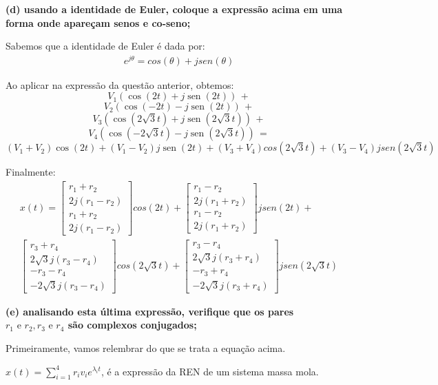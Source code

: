 \documentclass[11pt]{article}
\DeclareMathOperator{\sen}{sen}
\begin{document}
\textbf{(d) usando a identidade de Euler, coloque a expressão acima em uma forma onde apareçam senos e co-seno;}

Sabemos que a identidade de Euler é dada por:
\begin{align*}
  e^{j\theta} = cos(\theta) + jsen(\theta)
\end{align*}

Ao aplicar na expressão da questão anterior, obtemos:
\[V_1(\cos(2t)+j\sen(2t)) \, +\]
\[V_2(\cos(-2t)-j\sen(2t)) \, +\]
\[V_3(\cos(2\sqrt{3}t)+j\sen(2\sqrt{3}t)) \, +\]
\[V_4(\cos(-2\sqrt{3}t)-j\sen(2\sqrt{3}t)) \, =\]
\[(V_1+V_2)\cos(2t) + (V_1-V_2)j\sen(2t) + (V_3+V_4)cos(2\sqrt{3}t) + (V_3-V_4)jsen(2\sqrt{3}t)\]

Finalmente:
\begin{align*}
  x(t) =
  \begin{bmatrix}
    r_1+r_2\\
    2j(r_1-r_2)\\
    r_1+r_2\\
    2j(r_1-r_2)
  \end{bmatrix}
  cos(2t) +
    \begin{bmatrix}
      r_1-r_2\\
      2j(r_1+r_2)\\
      r_1-r_2\\
      2j(r_1+r_2)
    \end{bmatrix}
    jsen(2t) + \\
  \begin{bmatrix}
    r_3+r_4\\
    2\sqrt{3}j(r_3-r_4)\\
    -r_3-r_4\\
    -2\sqrt{3}j(r_3-r_4)
  \end{bmatrix}
  cos(2\sqrt{3}t) +
  \begin{bmatrix}
    r_3-r_4\\
    2\sqrt{3}j(r_3+r_4)\\
    -r_3+r_4\\
    -2\sqrt{3}j(r_3+r_4)
  \end{bmatrix}
  jsen(2\sqrt{3}t)
\end{align*}

\textbf{(e) analisando esta última expressão, verifique que os pares $r_1 \text{ e } r_2, r_3 \text{ e } r_4$ são complexos conjugados;}

Primeiramente, vamos relembrar do que se trata a equação acima.

$x(t) = \sum_{i=1}^4 r_i v_i e^{\lambda_i t}$, é a expressão da REN de um sistema massa mola.
\end{document}
